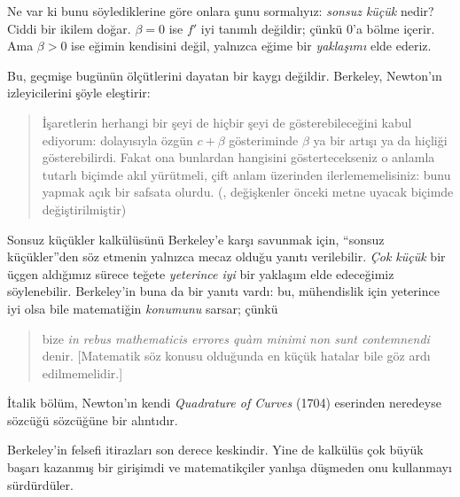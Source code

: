 Ne var ki bunu söylediklerine göre onlara şunu sormalıyız: \emph{sonsuz
küçük} nedir? Ciddi bir ikilem doğar. $\beta = 0$ ise $f'$ iyi tanımlı
değildir; çünkü $0$'a bölme içerir. Ama $\beta > 0$ ise eğimin kendisini değil,
yalnızca eğime bir \emph{yaklaşımı} elde ederiz.

Bu, geçmişe bugünün ölçütlerini dayatan bir kaygı değildir. Berkeley,
Newton'ın izleyicilerini şöyle eleştirir:
\begin{quote}
İşaretlerin herhangi bir şeyi de hiçbir şeyi de gösterebileceğini kabul
ediyorum: dolayısıyla özgün $c + \beta$ gösteriminde $\beta$ ya bir artışı ya
da hiçliği gösterebilirdi. Fakat ona bunlardan hangisini göstertecekseniz o
anlamla tutarlı biçimde akıl yürütmeli, çift anlam üzerinden ilerlememelisiniz:
bunu yapmak açık bir safsata olurdu. (\citealt[\S{}XIII]{Berkeley1734},
değişkenler önceki metne uyacak biçimde değiştirilmiştir)
\end{quote}
Sonsuz küçükler kalkülüsünü Berkeley'e karşı savunmak için, ``sonsuz
küçükler''den söz etmenin yalnızca mecaz olduğu yanıtı verilebilir. \emph{Çok
küçük} bir üçgen aldığımız sürece teğete \emph{yeterince iyi} bir yaklaşım
elde edeceğimiz söylenebilir. Berkeley'in buna da bir yanıtı vardı: bu,
mühendislik için yeterince iyi olsa bile matematiğin \emph{konumunu} sarsar;
çünkü
\begin{quote}
bize \emph{in rebus mathematicis errores qu\`{a}m minimi non sunt
contemnendi} denir. [Matematik söz konusu olduğunda en küçük hatalar bile göz
ardı edilmemelidir.] \citep[\S{}IX]{Berkeley1734}
\end{quote}
İtalik bölüm, Newton'ın kendi \emph{Quadrature of Curves} (1704) eserinden
neredeyse sözcüğü sözcüğüne bir alıntıdır.

Berkeley'in felsefi itirazları son derece keskindir. Yine de kalkülüs çok büyük
başarı kazanmış bir girişimdi ve matematikçiler yanlışa düşmeden onu
kullanmayı sürdürdüler.

